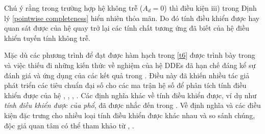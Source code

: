 \begin{gch}
Chú ý rằng trong trường hợp hệ không trễ ($A_d=0$) thì điều kiện iii) trong Định lý \ref{pointwise completeness} hiển nhiên thỏa mãn. Do đó tính điều khiển được hay quan sát được của hệ quay trở lại các tính chất tương ứng đã biết của hệ điều khiển tuyến tính không trễ.
\end{gch}

Mặc dù các phương trình để đạt được hàm hạch trong \eqref{t6} được trình bày trong \cite{Bre09} và \cite{Sip11} việc thiếu đi những kiến thức về nghiệm của hệ DDEs đã hạn chế đáng kể sự đánh giá và ứng dụng của các kết quả trong \cite{YiMay10}. Điều này đã khiến nhiều tác giả phát triển các tiêu chuẩn đại số cho các ma trận hệ số để phân tích tính điều khiển được của hệ \cite{Cor96}, \cite{Dua10}, \cite{Mon05}, \cite{YiEig10}. Các định nghĩa khác về tính điều khiển được, ví dụ như \emph{tính điều khiển được của phổ}, đã được nhắc đến trong \cite{Wei67}. Về định nghĩa và các điều kiện đặc trưng cho nhiều loại tính điều khiển được khác nhau và so sánh chúng, độc giả quan tâm có thể tham khảo từ \cite{Sip11}, \cite{Vyh09}. 

